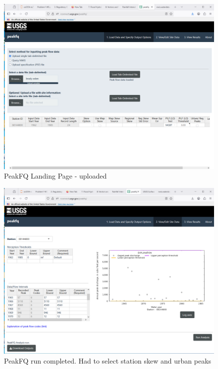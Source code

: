 \documentclass[12pt]{article}
\begin{document}
\begin{enumerate}
\begin{figure}[h!] %
   \centering
   \includegraphics[width=7in]{peakfq-uploaded.png} 
   \caption{PeakFQ Landing Page - uploaded }
   \label{fig:peakfq-uploaded}
\end{figure}

\begin{figure}[h!] %
   \centering
   \includegraphics[width=7in]{peakfq-after-run.png} 
   \caption{PeakFQ run completed.  Had to select station skew and urban peaks}
   \label{fig:peakfq-after-run}
\end{figure}


\end{enumerate}
\end{document}
